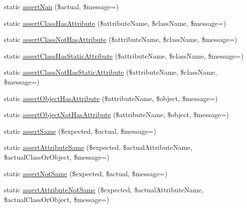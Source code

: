 \begin{DoxyCompactItemize}
\item 
static \mbox{\hyperlink{class_p_h_p_unit___framework___assert_a5564d9f49fb7ce43341023d2f8ac61d1}{assert\+Nan}} (\$actual, \$message=\textquotesingle{}\textquotesingle{})
\item 
static \mbox{\hyperlink{class_p_h_p_unit___framework___assert_a0d67fbe55d12058600be37b6f433a6e5}{assert\+Class\+Has\+Attribute}} (\$attribute\+Name, \$class\+Name, \$message=\textquotesingle{}\textquotesingle{})
\item 
static \mbox{\hyperlink{class_p_h_p_unit___framework___assert_aaffa5a4d4252f1304fb1227e3d81b7fe}{assert\+Class\+Not\+Has\+Attribute}} (\$attribute\+Name, \$class\+Name, \$message=\textquotesingle{}\textquotesingle{})
\item 
static \mbox{\hyperlink{class_p_h_p_unit___framework___assert_a078b1973dd0a767e03b89688fb0e76ae}{assert\+Class\+Has\+Static\+Attribute}} (\$attribute\+Name, \$class\+Name, \$message=\textquotesingle{}\textquotesingle{})
\item 
static \mbox{\hyperlink{class_p_h_p_unit___framework___assert_a85643ddb281700b4a24c0bc082497116}{assert\+Class\+Not\+Has\+Static\+Attribute}} (\$attribute\+Name, \$class\+Name, \$message=\textquotesingle{}\textquotesingle{})
\item 
static \mbox{\hyperlink{class_p_h_p_unit___framework___assert_acfb4f7d33bb2a3969fcb1dc244205d58}{assert\+Object\+Has\+Attribute}} (\$attribute\+Name, \$object, \$message=\textquotesingle{}\textquotesingle{})
\item 
static \mbox{\hyperlink{class_p_h_p_unit___framework___assert_a6b561b6fe0abde63f3a6718d96755aa3}{assert\+Object\+Not\+Has\+Attribute}} (\$attribute\+Name, \$object, \$message=\textquotesingle{}\textquotesingle{})
\item 
static \mbox{\hyperlink{class_p_h_p_unit___framework___assert_ad84af88e56a31ee524c5d5c228fb2c72}{assert\+Same}} (\$expected, \$actual, \$message=\textquotesingle{}\textquotesingle{})
\item 
static \mbox{\hyperlink{class_p_h_p_unit___framework___assert_a098ea93f3244084a2b29d3b228738d32}{assert\+Attribute\+Same}} (\$expected, \$actual\+Attribute\+Name, \$actual\+Class\+Or\+Object, \$message=\textquotesingle{}\textquotesingle{})
\item 
static \mbox{\hyperlink{class_p_h_p_unit___framework___assert_a64b0b458b9882df21f1ca75bb1d46830}{assert\+Not\+Same}} (\$expected, \$actual, \$message=\textquotesingle{}\textquotesingle{})
\item 
static \mbox{\hyperlink{class_p_h_p_unit___framework___assert_a08d45e35858dc4c6283f540fe821238b}{assert\+Attribute\+Not\+Same}} (\$expected, \$actual\+Attribute\+Name, \$actual\+Class\+Or\+Object, \$message=\textquotesingle{}\textquotesingle{})

\end{DoxyCompactItemize}

